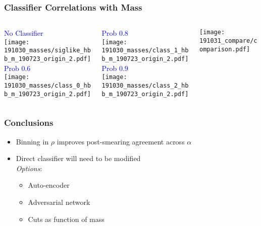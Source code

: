 \documentclass{beamer}
\newcommand{\beginbackup}{
  \newcounter{framenumbervorappendix}
  \setcounter{framenumbervorappendix}{\value{framenumber}}
}
\newcommand{\backupend}{
  \addtocounter{framenumbervorappendix}{-\value{framenumber}}
  \addtocounter{framenumber}{\value{framenumbervorappendix}}
}
\begin{document}
\begin{frame}
  \frametitle{Classifier Correlations with Mass}

  \begin{columns}
    \begin{column}{0.3\linewidth}
      \centering
      \textcolor{blue}{No Classifier} \\
      \texttt{[image: 191030\_masses/siglike\_hbb\_m\_190723\_origin\_2.pdf]} \\
      \textcolor{blue}{Prob $0.6$} \\
      \texttt{[image: 191030\_masses/class\_0\_hbb\_m\_190723\_origin\_2.pdf]}
    \end{column}
    \begin{column}{0.3\linewidth}
      \centering
      \textcolor{blue}{Prob $0.8$} \\
      \texttt{[image: 191030\_masses/class\_1\_hbb\_m\_190723\_origin\_2.pdf]} \\
      \textcolor{blue}{Prob $0.9$} \\
      \texttt{[image: 191030\_masses/class\_2\_hbb\_m\_190723\_origin\_2.pdf]}
    \end{column}
    \begin{column}{0.3\linewidth}
      \centering
      \texttt{[image: 191031\_compare/comparison.pdf]}
    \end{column}
  \end{columns}

\end{frame}


\begin{frame}
  \frametitle{Conclusions}

  \begin{itemize}
  \item Binning in $\rho$ improves post-smearing agreement across $\alpha$
  \item Direct classifier will need to be modified \\
    \emph{Options}:
    \begin{itemize}
    \item Auto-encoder
    \item Adversarial network
    \item Cuts as function of mass
    \end{itemize}
  \end{itemize}

\end{frame}


\begin{comment}
\beginbackup

\begin{frame}
  \centering
    {\Huge \bf\sffamily Backup Slides}
\end{frame}



\backupend
\end{comment}
\end{document}
